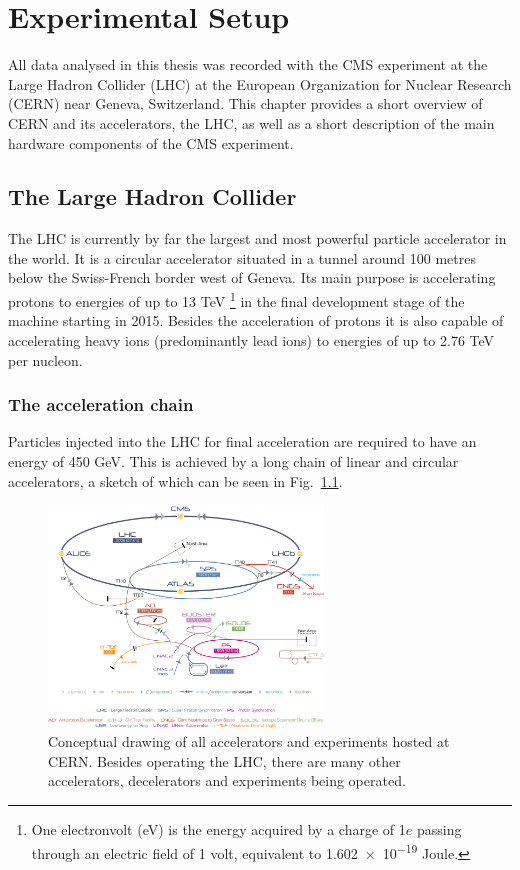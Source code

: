 \chapter{Experimental Setup}
\label{ch:exp}

All data analysed in this thesis was recorded with the CMS experiment at the Large Hadron
Collider (LHC) at the European Organization for Nuclear Research (CERN) near Geneva, Switzerland.
This chapter provides a short overview of CERN and its accelerators, the LHC, as well as a
short description of the main hardware components of the CMS experiment.

\section{The Large Hadron Collider}
\label{sec:lhc}
The LHC \cite{lhc_designreport} is currently by far the largest and most powerful particle accelerator in
the world. It is a circular accelerator situated in a tunnel around 100 metres below the Swiss-French
border west of Geneva. Its main purpose is accelerating protons to energies of up to 13 TeV
\footnote{One electronvolt (eV) is the energy acquired by a charge of 1$e$ passing through an electric field of 1 volt, equivalent to \num{1.602e-19} Joule.} 
in the final development stage of the machine starting in 2015. 
Besides the acceleration of protons it is also capable of accelerating heavy ions (predominantly lead ions) to energies of up to 
2.76 TeV per nucleon.

\subsection{The acceleration chain}
\label{sub:chain}
Particles injected into the LHC for final acceleration are required to have an energy of 450 GeV. This is
achieved by a long chain of linear and circular accelerators, a sketch of which can be seen in
Fig.~\ref{fig:accelerators}. 

\begin{figure}[h!]
    \centering
    \includegraphics[width=0.65\textwidth]{../figs/Cern-Accelerator-Complex.jpg}
    \caption{Conceptual drawing of all accelerators and experiments hosted at CERN. Besides operating
    the LHC, there are many other accelerators, decelerators and experiments being operated.}
    \label{fig:accelerators}
\end{figure}

